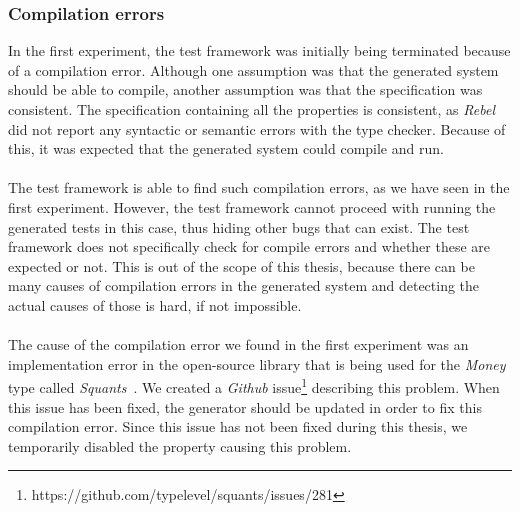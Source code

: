 \subsubsection{Compilation errors}
In the first experiment, the test framework was initially being terminated because of a
compilation error. Although one assumption was that the generated system should
be able to compile, another assumption was that the specification was
consistent. The specification containing all the properties is consistent,
as \textit{Rebel} did not report any syntactic or semantic errors with the type
checker. Because of this, it was expected that the generated system could
compile and run.\\
\\
The test framework is able to find such compilation errors, as we have seen in the first experiment. However, the test framework cannot proceed with running the generated tests in this case, thus hiding other bugs that can exist. The test framework does not specifically check for compile errors and whether these are expected or not. This is out of the scope of this thesis, because there can be many causes of compilation errors in the generated system and detecting the actual causes of those is hard, if not impossible.\\
\\
The cause of the compilation error we found in the first experiment was an implementation error in the open-source library that is being used for the \textit{Money} type called \textit{Squants}~\cite{siteSquants2017}. We
created a \textit{Github} issue\footnote{https://github.com/typelevel/squants/issues/281} describing this problem. When this issue has been fixed, the generator should be updated in order to fix this compilation error. Since this issue has not been fixed during this thesis, we temporarily disabled the property causing this problem.
